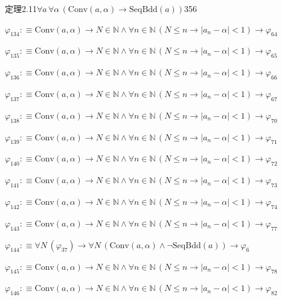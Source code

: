 \begin{fullproof}{定理2.11}{$\forall a\,\forall \alpha\,(\mathrm{Conv}(a,\alpha) \to \mathrm{SeqBdd}(a))$}{356}
\begin{abbrevlist}
\item $\varphi_{134} :\equiv \mathrm{Conv}(a,\alpha) \to N \in \mathbb{N} \land \forall n \in \mathbb{N}\,(N \leq n \to \lvert a_{n} - \alpha \rvert < 1) \to \varphi_{64}$
\item $\varphi_{135} :\equiv \mathrm{Conv}(a,\alpha) \to N \in \mathbb{N} \land \forall n \in \mathbb{N}\,(N \leq n \to \lvert a_{n} - \alpha \rvert < 1) \to \varphi_{65}$
\item $\varphi_{136} :\equiv \mathrm{Conv}(a,\alpha) \to N \in \mathbb{N} \land \forall n \in \mathbb{N}\,(N \leq n \to \lvert a_{n} - \alpha \rvert < 1) \to \varphi_{66}$
\item $\varphi_{137} :\equiv \mathrm{Conv}(a,\alpha) \to N \in \mathbb{N} \land \forall n \in \mathbb{N}\,(N \leq n \to \lvert a_{n} - \alpha \rvert < 1) \to \varphi_{67}$
\item $\varphi_{138} :\equiv \mathrm{Conv}(a,\alpha) \to N \in \mathbb{N} \land \forall n \in \mathbb{N}\,(N \leq n \to \lvert a_{n} - \alpha \rvert < 1) \to \varphi_{70}$
\item $\varphi_{139} :\equiv \mathrm{Conv}(a,\alpha) \to N \in \mathbb{N} \land \forall n \in \mathbb{N}\,(N \leq n \to \lvert a_{n} - \alpha \rvert < 1) \to \varphi_{71}$
\item $\varphi_{140} :\equiv \mathrm{Conv}(a,\alpha) \to N \in \mathbb{N} \land \forall n \in \mathbb{N}\,(N \leq n \to \lvert a_{n} - \alpha \rvert < 1) \to \varphi_{72}$
\item $\varphi_{141} :\equiv \mathrm{Conv}(a,\alpha) \to N \in \mathbb{N} \land \forall n \in \mathbb{N}\,(N \leq n \to \lvert a_{n} - \alpha \rvert < 1) \to \varphi_{73}$
\item $\varphi_{142} :\equiv \mathrm{Conv}(a,\alpha) \to N \in \mathbb{N} \land \forall n \in \mathbb{N}\,(N \leq n \to \lvert a_{n} - \alpha \rvert < 1) \to \varphi_{74}$
\item $\varphi_{143} :\equiv \mathrm{Conv}(a,\alpha) \to N \in \mathbb{N} \land \forall n \in \mathbb{N}\,(N \leq n \to \lvert a_{n} - \alpha \rvert < 1) \to \varphi_{77}$
\item $\varphi_{144} :\equiv \forall N\,(\varphi_{37}) \to \forall N\,(\mathrm{Conv}(a,\alpha) \land \neg \mathrm{SeqBdd}(a)) \to \varphi_{6}$
\item $\varphi_{145} :\equiv \mathrm{Conv}(a,\alpha) \to N \in \mathbb{N} \land \forall n \in \mathbb{N}\,(N \leq n \to \lvert a_{n} - \alpha \rvert < 1) \to \varphi_{78}$
\item $\varphi_{146} :\equiv \mathrm{Conv}(a,\alpha) \to N \in \mathbb{N} \land \forall n \in \mathbb{N}\,(N \leq n \to \lvert a_{n} - \alpha \rvert < 1) \to \varphi_{82}$

\end{abbrevlist}
\end{fullproof}
